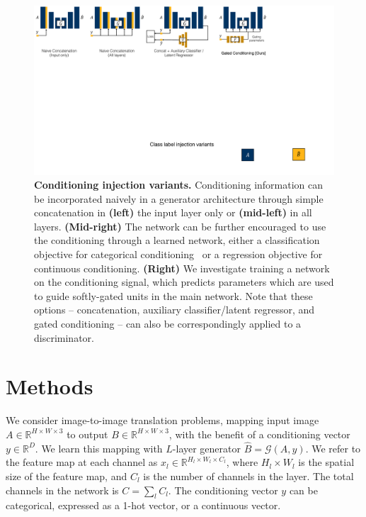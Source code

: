\begin{figure}[t]
    \centering
    \includegraphics[width=\linewidth]{paper_images/arch_inject.pdf}
    \caption{{\bf Conditioning injection variants.} Conditioning information can be incorporated naively in a generator architecture through simple concatenation in {\bf (left)} the input layer only or {\bf (mid-left)} in all layers. {\bf (Mid-right)} The network can be further encouraged to use the conditioning through a learned network, either a classification objective for categorical conditioning~\cite{XX,XX} or a regression objective for continuous conditioning. {\bf (Right)} We investigate training a network on the conditioning signal, which predicts parameters which are used to guide softly-gated units in the main network. Note that these options -- concatenation, auxiliary classifier/latent regressor, and gated conditioning -- can also be correspondingly applied to a discriminator.\label{fig:arch-inj} }
\end{figure}

\section{Methods}

We consider image-to-image translation problems, mapping input image $A \in \mathds{R}^{H\times W\times 3}$ to output $B \in \mathds{R}^{H\times W\times 3}$, with the benefit of a conditioning vector $y \in \mathds{R}^{D}$. We learn this mapping with $L$-layer generator $\widehat{B}=\mathcal{G}(A,y)$. We refer to the feature map at each channel as $x_l\in \mathds{R}^{H_l\times W_l\times C_l}$, where $H_l \times W_l$ is the spatial size of the feature map, and $C_l$ is the number of channels in the layer. The total channels in the network is $C = \sum_l C_l$. The conditioning vector $y$ can be categorical, expressed as a 1-hot vector, or a continuous vector.

